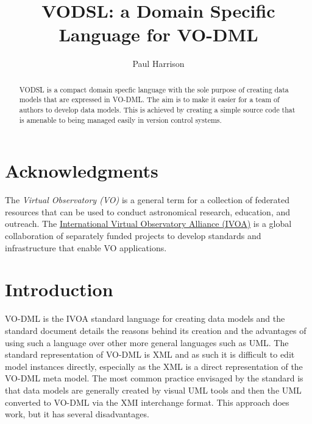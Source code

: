 \documentclass[11pt,a4paper]{ivoa}
\title{VODSL: a Domain Specific Language for VO-DML}
\author[https://wiki.ivoa.net/twiki/bin/view/IVOA/PaulHarrison]{Paul Harrison}
\begin{document}
\begin{abstract}
VODSL is a compact domain specfic language with the sole purpose of creating data models that are expressed in VO-DML. The aim is to make
it easier for a team of authors to develop data models. This is achieved by creating a simple source code that
is amenable to being managed easily in version control systems.
\end{abstract}


\section*{Acknowledgments}

The \emph{Virtual Observatory (VO)} is a
general term for a collection of federated resources that can be used
to conduct astronomical research, education, and outreach.
The \href{https://www.ivoa.net}{International
Virtual Observatory Alliance (IVOA)} is a global
collaboration of separately funded projects to develop standards and
infrastructure that enable VO applications.


\section{Introduction}

VO-DML is the IVOA standard language for creating data models and the standard document  \cite{2018ivoa.spec.0910L} details the reasons behind its
creation and the advantages of using such a language over other more general languages such as UML. The standard representation of VO-DML is XML and as such
it is difficult to edit model instances directly, especially as the XML is a direct representation of the VO-DML meta model. The most common practice envisaged by the
standard is that data models are generally created by visual UML tools and then the UML converted to VO-DML via the XMI interchange format. This approach does work,
but it has several disadvantages.
\end{document}

